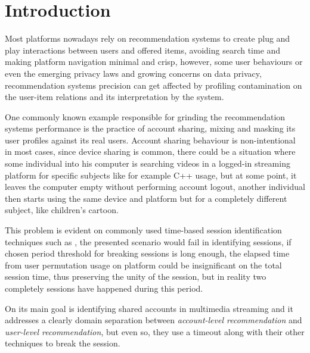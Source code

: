 \documentclass[ecp,tc,english]{iiufrgs}
\begin{document}
\tableofcontents %


\chapter{Introduction} %
Most platforms nowadays rely on recommendation systems to create plug and play interactions between users and offered items, avoiding search time and making platform navigation minimal and crisp, however, some user behaviours or even the emerging privacy laws and growing concerns on data privacy, recommendation systems precision can get affected by profiling contamination on the user-item relations  and its interpretation by the system.

One commonly known example responsible for grinding the recommendation systems performance is the practice of account sharing, mixing and masking its user profiles against its real users. Account sharing behaviour is non-intentional in most cases, since device sharing is common, there could be a situation where some individual into his computer is searching videos in a logged-in streaming platform for specific subjects like for example C++ usage, but at some point, it leaves the computer empty without performing account logout, another individual then starts using the same device and platform but for a completely different subject, like children's cartoon.

This problem is evident on commonly used time-based session identification techniques such as \cite{10.1145/2736277.2741117}, the presented scenario would fail in identifying sessions, if chosen period threshold for breaking sessions is long enough, the elapsed time from user permutation usage on platform could be insignificant on the total session time, thus preserving the unity of the session, but in reality two completely sessions have happened during this period.

On \cite{Jiang:2018:IUB:3209978.3210054} its main goal is identifying shared accounts in multimedia streaming and it addresses a clearly domain separation between \textit{account-level recommendation} and \textit{user-level recommendation}, but even so, they use a timeout along with their other techniques to break the session.

\end{document}
